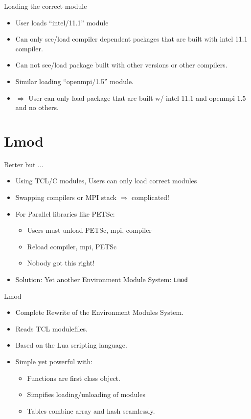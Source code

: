 \documentclass{beamer}
\begin{document}
\begin{frame}{Loading the correct module}
  \begin{itemize}
    \item User loads ``intel/11.1'' module
    \item Can only see/load compiler dependent packages that are built with
      intel 11.1 compiler.
    \item Can not see/load package built with other versions or other compilers.
    \item Similar loading ``openmpi/1.5'' module.
    \item $\Rightarrow$ User can only load package that are built w/ intel 11.1 and openmpi 1.5 and no others.
  \end{itemize}
\end{frame}

\section{Lmod}

\begin{frame}{Better but ...}
  \begin{itemize}
    \item Using TCL/C modules, Users can only load correct modules
    \item Swapping compilers or MPI stack $\Rightarrow$ complicated!
    \item For Parallel libraries like PETSc:
      \begin{itemize}
        \item Users must unload PETSc, mpi, compiler
        \item Reload compiler, mpi, PETSc
        \item Nobody got this right!
      \end{itemize}
    \item Solution: Yet another Environment Module System: \texttt{Lmod}
  \end{itemize}
\end{frame}

\begin{frame}{Lmod}
  \begin{itemize}
    \item Complete Rewrite of the Environment Modules System.
    \item Reads TCL modulefiles.
    \item Based on the Lua scripting language.
    \item Simple yet powerful with:
      \begin{itemize}
        \item Functions are first class object.
        \item Simpifies loading/unloading of modules
        \item Tables combine array and hash seamlessly.
      \end{itemize}
  \end{itemize}
\end{frame}
\end{document}
